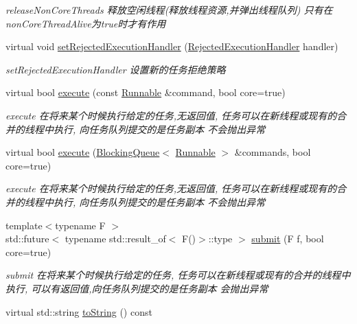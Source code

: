 \begin{DoxyCompactItemize}
\begin{DoxyCompactList}\small\item\em release\+Non\+Core\+Threads 释放空闲线程(释放线程资源,并弹出线程队列) 只有在non\+Core\+Thread\+Alive为true时才有作用 \end{DoxyCompactList}\item 
virtual void \hyperlink{classThreadPoolExecutor_a0e8838b0dcb195c2b4693bdab1eacf39}{set\+Rejected\+Execution\+Handler} (\hyperlink{classRejectedExecutionHandler}{Rejected\+Execution\+Handler} handler)
\begin{DoxyCompactList}\small\item\em set\+Rejected\+Execution\+Handler 设置新的任务拒绝策略 \end{DoxyCompactList}\item 
virtual bool \hyperlink{classThreadPoolExecutor_adb3c813875b9abfad2e6d67dabab2d53}{execute} (const \hyperlink{classRunnable}{Runnable} \&command, bool core=true)
\begin{DoxyCompactList}\small\item\em execute 在将来某个时候执行给定的任务,无返回值, 任务可以在新线程或现有的合并的线程中执行, 向任务队列提交的是任务副本 不会抛出异常 \end{DoxyCompactList}\item 
virtual bool \hyperlink{classThreadPoolExecutor_ae24770a14741a5d320da4cc78f01c2d6}{execute} (\hyperlink{classBlockingQueue}{Blocking\+Queue}$<$ \hyperlink{classRunnable}{Runnable} $>$ \&commands, bool core=true)
\begin{DoxyCompactList}\small\item\em execute 在将来某个时候执行给定的任务,无返回值, 任务可以在新线程或现有的合并的线程中执行, 向任务队列提交的是任务副本 不会抛出异常 \end{DoxyCompactList}\item 
{\footnotesize template$<$typename F $>$ }\\std\+::future$<$ typename std\+::result\+\_\+of$<$ F()$>$\+::type $>$ \hyperlink{classThreadPoolExecutor_a94834ab6bedcc75111524fec4e928b3f}{submit} (F f, bool core=true)
\begin{DoxyCompactList}\small\item\em submit 在将来某个时候执行给定的任务, 任务可以在新线程或现有的合并的线程中执行, 可以有返回值,向任务队列提交的是任务副本 会抛出异常 \end{DoxyCompactList}\item 
virtual std\+::string \hyperlink{classThreadPoolExecutor_a8e340cec3bb976f7773db103d73189c2}{to\+String} () const

\end{DoxyCompactItemize}
